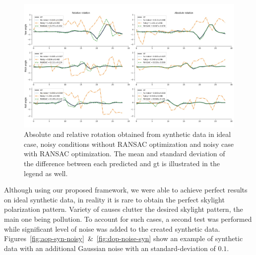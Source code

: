 \begin{figure}
  \centering
  \includegraphics[width=1\textwidth]{./content/experiments/figures/syn-res.jpeg}
  \caption{Absolute and relative rotation obtained from synthetic data in ideal
  case, noisy conditions without RANSAC optimization and noisy case with RANSAC
optimization. The mean and standard deviation of the difference between each
predicted and \gls{gt} is illustrated in the legend as well.}
  \label{fig:res-syn}
\end{figure}


Although using our proposed framework, we were able to achieve perfect results
on ideal synthetic data, in reality it is rare to obtain the perfect skylight
polarization pattern. Variety of causes clutter the desired skylight pattern,
the main one being pollution. To account for such cases, a second test was
performed while significant level of noise was added to the created synthetic
data. Figures~\ref{fig:aop-syn-noisy}~\&~\ref{fig:dop-noise-syn} show an
example of synthetic data with an additional Gaussian noise with an
standard-deviation of $0.1$.


